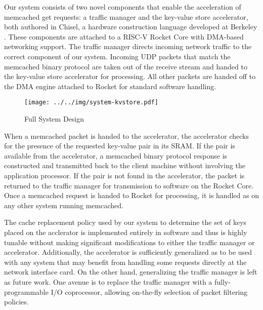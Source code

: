 Our system consists of two novel components that enable the acceleration of 
memcached get requests: a traffic manager and the key-value store accelerator, 
both authored in Chisel, a hardware construction language developed at Berkeley \cite{chisel}.
These components are attached to a RISC-V Rocket Core with DMA-based networking 
support. The traffic manager directs incoming network traffic to the correct 
component of our system. Incoming UDP packets that match the memcached binary 
protocol are taken out of the receive stream and handed to the key-value store 
accelerator for processing. All other packets are handed off to the DMA 
engine attached to Rocket for standard software handling.

\begin{figure}[t]
\begin{center}
\texttt{[image: ../../img/system-kvstore.pdf]}
\caption{Full System Design}
\label{fig:full-sys}
\end{center}
\end{figure}

When a memcached packet is handed to the accelerator, the accelerator checks 
for the presence of the requested key-value pair in its SRAM. If the pair is
available from the accelerator, a memcached binary protocol response is 
constructed and transmitted back to the client machine without involving the 
application processor. If the pair is not found in the accelerator, the packet 
is returned to the traffic manager for transmission to software on the Rocket 
Core. Once a memcached request is handed to Rocket for processing, it is 
handled as on any other system running memcached.

The cache replacement policy used by our system to determine the set of keys
placed on the acclerator is implemented entirely in software and thus is 
highly tunable without making significant modifications to either the traffic
manager or accelerator. Additionally, the accelerator is sufficiently 
generalized as to be used with any system that may benefit from handling some
requests directly at the network interface card. On the other hand, 
generalizing the traffic manager is left as future work. One avenue is to 
replace the traffic manager with a fully-programmable I/O coprocessor, allowing
on-the-fly selection of packet filtering policies.



